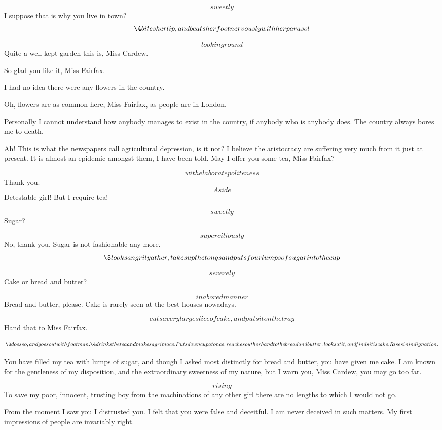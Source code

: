 \documentclass{book}
\begin{document}
\5  \[sweetly\]  I suppose that is why you live in town?
\[\4 bites her lip, and beats her foot nervously with her
parasol\]

\4  \[looking round\]  Quite a well-kept garden this is,
Miss Cardew.

\5  So glad you like it, Miss Fairfax.

\4  I had no idea there were any flowers in the country.

\5  Oh, flowers are as common here, Miss Fairfax, as people
are in London.

\4  Personally I cannot understand how anybody manages to
exist in the country, if anybody who is anybody does.  The country
always bores me to death.

\5  Ah!  This is what the newspapers call agricultural
depression, is it not?  I believe the aristocracy are suffering
very much from it just at present.  It is almost an epidemic
amongst them, I have been told.  May I offer you some tea, Miss
Fairfax?

\4\[with elaborate politeness\] Thank you. \[Aside\] Detestable girl!
But I require tea!

\5  \[sweetly\]  Sugar?

\4  \[superciliously\]  No, thank you.  Sugar is not
fashionable any more. \[\5 looks angrily at her, takes up the
tongs and puts four lumps of sugar into the cup\]

\5  \[severely\]  Cake or bread and butter?

\4  \[in a bored manner\]  Bread and butter, please.  Cake
is rarely seen at the best houses nowadays.

\5  \[cuts a very large slice of cake, and puts it on the
tray\]  Hand that to Miss Fairfax.

\[\8 does so, and goes out with footman.  \4 drinks the
tea and makes a grimace. Puts down cup at once, reaches out her
hand to the bread and butter, looks at it, and finds it is cake.
Rises in indignation.\]

\4  You have filled my tea with lumps of sugar, and though
I asked most distinctly for bread and butter, you have given me
cake.  I am known for the gentleness of my disposition, and the
extraordinary sweetness of my nature, but I warn you, Miss Cardew,
you may go too far.

\5  \[rising\]  To save my poor, innocent, trusting boy from
the machinations of any other girl there are no lengths to which I
would not go.

\4  From the moment I saw you I distrusted you.  I felt
that you were false and deceitful.  I am never deceived in such
matters.  My first impressions of people are invariably right.
\end{document}
